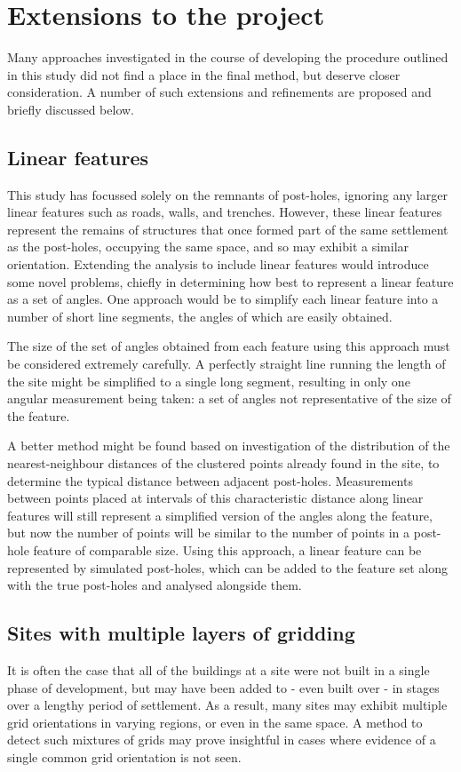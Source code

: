 \documentclass[../../ArchStats.tex]{subfiles}
\begin{document}
\section{Extensions to the project}

Many approaches investigated in the course of developing the procedure outlined in this study did not find a place in the final method, but deserve closer consideration. A number of such extensions and refinements are proposed and briefly discussed below.

\subsection{Linear features}
This study has focussed solely on the remnants of post-holes, ignoring any larger linear features such as roads, walls, and trenches. However, these linear features represent the remains of structures that once formed part of the same  settlement as the post-holes, occupying the same space, and so may exhibit a similar orientation. Extending the analysis to include linear features would introduce some novel problems, chiefly in determining how best to represent a linear feature as a set of angles. One approach would be to simplify each linear feature into a number of short line segments, the angles of which are easily obtained.

The size of the set of angles obtained from each feature using this approach must be considered extremely carefully. A perfectly straight line running the length of the site might be simplified to a single long segment, resulting in only one angular measurement being taken: a set of angles not representative of the size of the feature.

A better method might be found based on investigation of the  distribution of the nearest-neighbour distances of the clustered points already found in the site, to determine the typical distance between adjacent post-holes. Measurements between points placed at intervals of this characteristic distance along linear features will still represent a simplified version of the angles along the  feature, but now the number of points will be similar to the number of points in a post-hole feature of comparable size. Using this approach, a linear feature can be represented by simulated post-holes, which can be added to the feature set along with the true post-holes and analysed alongside them. 

\subsection{Sites with multiple layers of gridding}
\label{sec:multiple-grids}
It is often the case that all of the buildings at a site were not built in a single phase of development, but may have been added to - even built over - in stages over a lengthy period of settlement. As a result, many sites may exhibit multiple grid orientations in varying regions, or even in the same space. A method to detect such mixtures of grids may prove insightful in cases where evidence of a single common grid orientation is not seen.
\end{document}
